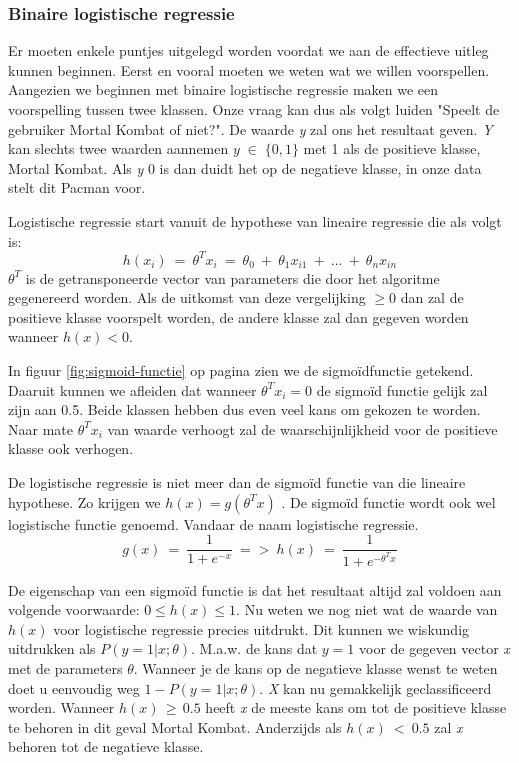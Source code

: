 \subsubsection{Binaire logistische regressie}
\label{sec:Binaire-logistische-regressie}

Er moeten enkele puntjes uitgelegd worden voordat we aan de effectieve uitleg kunnen beginnen. Eerst en vooral moeten we weten wat we willen voorspellen. Aangezien we beginnen met binaire logistische regressie maken we een voorspelling tussen twee klassen. Onze vraag kan dus als volgt luiden "Speelt de gebruiker Mortal Kombat of niet?". De waarde \textit{y} zal ons het resultaat geven. \textit{Y} kan slechts twee waarden aannemen $y \; \in \; \{0,1\}$ met 1 als de positieve klasse, Mortal Kombat. Als \textit{y} 0 is dan duidt het op de negatieve klasse, in onze data stelt dit Pacman voor. 

Logistische regressie start vanuit de hypothese van lineaire regressie die als volgt is: 
$$
h(x_{i}) \:= \: \theta^{T}x_{i} \:=\: \theta_{0} \:+ \:\theta_{1}x_{i1} \:+ \: ...\: + \: \theta_{n}x_{in}
$$
$ \theta^{T}$ is de getransponeerde vector van parameters die door het algoritme gegenereerd worden. Als de uitkomst van deze vergelijking $\geq 0$ dan zal de positieve klasse voorspelt worden, de andere klasse zal dan gegeven worden wanneer $h(x) < 0$. 

In figuur \ref{fig:sigmoid-functie} op pagina \pageref{fig:sigmoid-functie}zien we de sigmoïdfunctie getekend.  Daaruit kunnen we afleiden dat wanneer  $\theta^{T}x_{i} = 0$ de sigmoïd functie gelijk zal zijn aan 0.5. Beide klassen hebben dus even veel kans om gekozen te worden. Naar mate  $\theta^{T}x_{i}$ van waarde verhoogt zal de waarschijnlijkheid voor de positieve klasse ook verhogen. 

De logistische regressie is niet meer dan de sigmoïd functie van die lineaire hypothese. Zo krijgen we $h(x) = g(\theta^{T}x)$ . De sigmoïd functie wordt ook wel logistische functie genoemd. Vandaar de naam logistische regressie. 
$$
g(x) \: = \: {\frac{1}{1+e^{-x}}} \: => \: h(x) \: = \:{\frac{1}{1+e^{-\theta^{T}x }}}
$$

De eigenschap van een sigmoïd functie is dat het resultaat altijd zal voldoen aan volgende voorwaarde: $ 0 \leq h(x) \leq1$. 
Nu weten we nog niet wat de waarde van $h(x)$ voor logistische regressie precies uitdrukt. Dit kunnen we wiskundig uitdrukken als $P(y=1|x;\theta)$. M.a.w. de kans dat $y = 1$ voor de gegeven vector \textit{x} met de parameters $\theta$. Wanneer je de kans op de negatieve klasse wenst te weten doet u eenvoudig weg $1 - P(y=1|x;\theta)$. 
\textit{X} kan nu gemakkelijk geclassificeerd worden. Wanneer $h(x)\,\geq\,0.5$ heeft \textit{x} de meeste kans om tot de positieve klasse te behoren in dit geval Mortal Kombat. Anderzijds als $h(x)\:<\:0.5$ zal \textit{x} behoren tot de negatieve klasse. 


